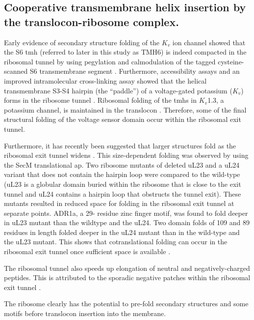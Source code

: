 \subsection{Cooperative transmembrane helix insertion by the translocon-ribosome complex.}

Early evidence of secondary structure folding of the $K_{v}$ ion channel showed that the S6 \gls{tmh} (referred to later in this study as TMH6) is indeed compacted in the ribosomal tunnel by using pegylation and calmodulation of the tagged cysteine-scanned S6 transmembrane segment \cite{Lu2005}.
Furthermore, accessibility assays and an improved intramolecular  cross\--linking assay showed that the helical transmembrane S3\--S4 hairpin (the “paddle”) of a voltage-gated potassium ($K_{v}$) forms in the ribosome tunnel \cite{Tu2014}.
Ribosomal folding of the \gls{tmh}s in $K_{v}$1.3, a potassium channel, is maintained in the translocon \cite{Tu2010a}.
Therefore, some of the final structural folding of the voltage sensor domain occur within the ribosomal exit tunnel.

Furthermore, it has recently been suggested that larger structures fold as the ribosomal exit tunnel widens \cite{Kudva2018}.
This size\--dependent folding was observed by using the SecM translational \gls{ap}.
Two ribosome mutants of deleted uL23 and a uL24 variant that does not contain the hairpin loop were compared to the wild\--type (uL23 is a globular domain buried within the ribosome that is close to the exit tunnel and uL24 contains a hairpin loop that obstructs the tunnel exit).
These mutants resulted in reduced space for folding in the ribosomal exit tunnel at separate points.
ADR1a, a 29\-- residue zinc finger motif, was found to fold deeper in uL23 mutant than the wildtype and the uL24.
Two domain folds of 109 and 89 residues in length folded deeper in the uL24 mutant than in the wild\--type and the uL23 mutant.
This shows that  cotranslational folding can occur in the ribosomal exit tunnel once sufficient space is available \cite{Kudva2018}.

The ribosomal tunnel also speeds up elongation of neutral and negatively-charged peptides.
This is attributed to the sporadic negative patches within the ribosomal exit tunnel \cite{Lu2008}.

The ribosome clearly has the potential to pre\--fold secondary structures and some motifs before translocon insertion into the membrane.

